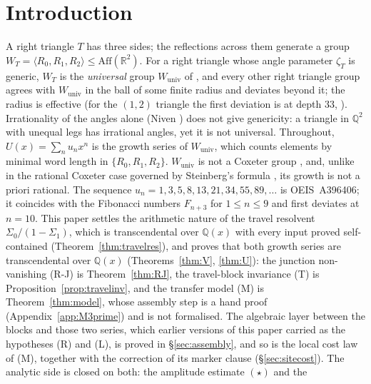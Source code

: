 \documentclass[11pt]{article}
\theoremstyle{plain}
\theoremstyle{definition}
\theoremstyle{remark}
\newcommand{\Q}{\mathbb{Q}}
\newcommand{\R}{\mathbb{R}}
\begin{document}
\section{Introduction}\label{sec:intro}

A right triangle $T$ has three sides; the reflections across them generate a group
$W_T=\langle R_0,R_1,R_2\rangle\le\mathrm{Aff}(\R^2)$. For a right triangle whose angle
parameter $\zeta_T$ is generic, $W_T$ is the \emph{universal} group $W_{\mathrm{univ}}$ of
\cite{Bonfioli2026a}, and every other right triangle group agrees with $W_{\mathrm{univ}}$ in the
ball of some finite radius and deviates beyond it; the radius is effective
\cite[Theorem ``Effective universality'', \textup{thm:effective-universality}]{Bonfioli2026a}
\textup{(}for the $(1,2)$ triangle the first deviation is at depth $33$,
\cite[Theorem ``Sharp uniform universality at depth $32$'', \textup{thm:universality-sharp}]{Bonfioli2026a}\textup{)}.
Irrationality of the angles alone
\textup{(}Niven \cite{Niven1956}\textup{)} does not give genericity: a triangle in $\Q^2$ with
unequal legs has irrational angles, yet it is not universal. Throughout, $U(x)=\sum_nu_nx^n$ is the
growth series of $W_{\mathrm{univ}}$, which counts elements by minimal word length in
$\{R_0,R_1,R_2\}$. $W_{\mathrm{univ}}$ is not a Coxeter group \cite{IsolaPiergallini}, and, unlike in
the rational Coxeter case governed by Steinberg's formula \cite{StanleyEC2}, its growth is not a
priori rational. The sequence $u_n=1,3,5,8,13,21,34,55,89,\dots$ is \textup{OEIS~A396406}; it
coincides with the Fibonacci numbers $F_{n+3}$ for $1\le n\le9$ and first deviates at $n=10$. This
paper settles the arithmetic nature of the travel resolvent $\Sigma_0/(1-\Sigma_1)$, which is
transcendental over $\Q(x)$ with every input proved self-contained
(Theorem~\ref{thm:travelres}), and proves that both growth series are transcendental over $\Q(x)$
(Theorems~\ref{thm:V}, \ref{thm:U}): the junction non-vanishing \textup{(R-J)} is
Theorem~\ref{thm:RJ}, the travel-block invariance \textup{(T)} is
Proposition~\ref{prop:travelinv}, and the transfer model \textup{(M)} is Theorem~\ref{thm:model},
whose assembly step is a hand proof (Appendix~\ref{app:M3prime}) and is not formalised. The algebraic layer between the blocks and those two series, which
earlier versions of this paper carried as the hypotheses \textup{(R)} and \textup{(L)}, is proved
in \S\ref{sec:assembly}, and so is the local cost law of \textup{(M)}, together with the correction
of its marker clause (\S\ref{sec:sitecost}). The analytic side is closed on both: the amplitude estimate $(\star)$ and the
\end{document}
